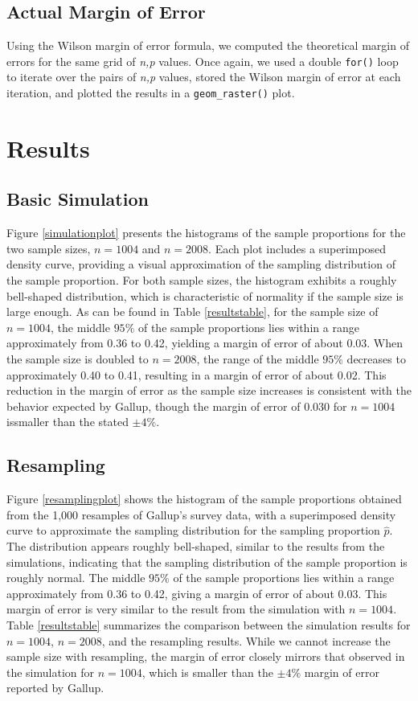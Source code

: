 \documentclass{article}\usepackage[]{graphicx}\usepackage[]{xcolor}
\begin{document}
\begin{multicols}{2}
\subsection{Actual Margin of Error}
Using the Wilson margin of error formula, we computed the theoretical margin of errors for
the same grid of \textit{n,p} values. Once again, we used a double \texttt{for()} loop
to iterate over the pairs of \textit{n,p} values, stored the Wilson margin of error
at each iteration, and plotted the results in a \texttt{geom\_raster()} plot. 

\pagebreak

\section{Results}
\subsection{Basic Simulation}
Figure \ref{simulationplot} presents the histograms of the sample proportions
for the two sample sizes, $n=1004$ and $n=2008$. Each plot includes a superimposed
density curve, providing a visual approximation of the sampling distribution of 
the sample proportion. For both sample sizes, the histogram exhibits a roughly
bell-shaped distribution, which is characteristic of normality if the sample
size is large enough. As can be found in Table \ref{resultstable}, 
for the sample size of $n=1004$, the middle $95\%$ of the sample proportions lies within a range approximately from 0.36 to 0.42, yielding a margin of error of about 0.03. When the sample size is doubled to $n=2008$, the range of the middle $95\%$ decreases to approximately 0.40 to 0.41, resulting in a margin of error of about 0.02. This 
reduction in the margin of error as the sample size increases is consistent with the behavior expected by Gallup, though the margin of error of 0.030 for $n=1004$ issmaller than the stated $\pm 4\%$.

\subsection{Resampling}
Figure \ref{resamplingplot} shows the histogram of the sample proportions obtained
from the 1,000 resamples of Gallup's survey data, with a superimposed density
curve to approximate the sampling distribution for the sampling proportion $\hat{p}$.
The distribution appears roughly bell-shaped, similar to the results from the simulations,
indicating that the sampling distribution of the sample proportion is roughly normal. 
The middle $95\%$ of the sample proportions lies within a range approximately from 0.36 to 0.42, giving a margin of error of about 0.03. This margin of error is very similar to the result from the simulation with $n=1004$. Table \ref{resultstable} summarizes the comparison between the simulation results for $n=1004$, $n=2008$, and the resampling results. While we cannot increase the sample size with resampling, the margin of error closely mirrors that observed in the simulation for $n=1004$, which is smaller than the $\pm 4\%$ margin of error reported by Gallup.




\end{multicols}
\end{document}
